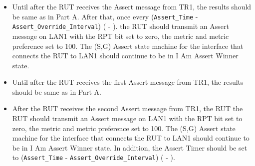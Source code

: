 \documentclass[11pt]{report}
\begin{document}

\begin{itemize}

  \item Until after the RUT receives the Assert message from TR1, the results
  should be same as in Part A. After that, once every \newline
  (\verb=Assert_Time= - \verb=Assert_Override_Interval=)
  ({\PimsmAssertTime} - {\PimsmAssertOverrideInterval}).
  the RUT should transmit an Assert message on LAN1 with the RPT bit set to
  zero, the metric and metric preference set to 100. The (S,G) Assert state
  machine for the interface that connects the RUT to LAN1 should continue to
  be in I Am Assert Winner state.

\end{itemize}


\begin{itemize}

  \item Until after the RUT receives the first Assert message from TR1, the
  results should be same as in Part A.

  \item After the RUT receives the second Assert message from TR1, the RUT
  the RUT should transmit an Assert message on LAN1 with the RPT bit set to
  zero, the metric and metric preference set to 100. The (S,G) Assert state
  machine for the interface that connects the RUT to LAN1 should continue to
  be in I Am Assert Winner state. In addition, the Assert Timer should be set
  to \newline
  (\verb=Assert_Time= - \verb=Assert_Override_Interval=)
  ({\PimsmAssertTime} - {\PimsmAssertOverrideInterval}).

\end{itemize}

\end{document}
